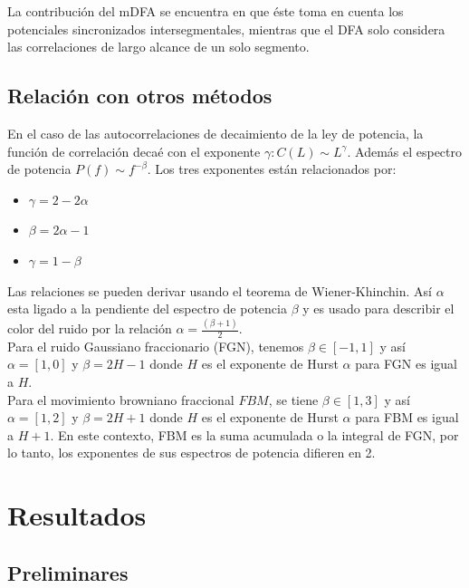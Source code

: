 \documentclass[letterpaper,titlepage,12pt,draft]{report}
\begin{document}
La contribuci\'on del mDFA se encuentra en que \'este toma en cuenta los potenciales sincronizados intersegmentales, mientras que el DFA solo considera las correlaciones de largo alcance de un solo segmento. 


\section{Relaci\'on con otros m\'etodos}

En el caso de las autocorrelaciones de decaimiento de la ley de potencia, la funci\'on de correlaci\'on deca\'e con el exponente $\gamma:C(L)\sim L^{\gamma}$. Adem\'as el espectro de potencia $P(f)\sim f^{-\beta}$. Los tres exponentes est\'an relacionados por:
\begin{itemize}
\item $\gamma=2-2\alpha$
\item $\beta=2\alpha-1$
\item $\gamma=1-\beta$
\end{itemize}
Las relaciones se pueden derivar usando el teorema de Wiener-Khinchin. As\'i $\alpha$ esta ligado a la pendiente del espectro de potencia $\beta$ y es usado para describir el color del ruido por la relaci\'on $\alpha=\frac{(\beta+1)}{2}$.\\

Para el ruido Gaussiano fraccionario (FGN), tenemos $\beta\in[-1,1]$ y as\'i $\alpha=[1,0]$ y $\beta=2H-1$ donde $H$ es el exponente de Hurst  $\alpha$ para FGN es igual a $H$.\\

Para el movimiento browniano fraccional $FBM$, se tiene $\beta\in[1,3]$ y as\'i $\alpha=[1,2]$ y $\beta=2H+1$ donde $H$ es el exponente de Hurst $\alpha$ para FBM es igual a $H+1$. En este contexto, FBM es la suma acumulada o la integral de FGN, por lo tanto, los exponentes de sus espectros de potencia difieren en 2.



\newpage
\chapter{Resultados}

\section{Preliminares}
\end{document}
